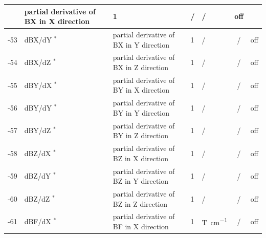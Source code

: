 \begin{landscape}
\begin{longtable}{|r|l|l|l|l|c|c|}
                           & partial derivative of BX in X direction  
                           & 1                            & /
			   & /              & off         
    \\ \hline
    -53                    & dBX/dY $^*$
                           & partial derivative of BX in Y direction  
                           & 1                            & /
			   & /              & off         
    \\ \hline
    -54                    & dBX/dZ $^*$
                           & partial derivative of BX in Z direction  
                           & 1                            & /
			   & /              & off         
    \\ \hline
    -55                    & dBY/dX $^*$
                           & partial derivative of BY in X direction  
                           & 1                            & /
			   & /              & off         
    \\ \hline
    -56                    & dBY/dY $^*$
                           & partial derivative of BY in Y direction  
                           & 1                            & /
			   & /              & off         
    \\ \hline
    -57                    & dBY/dZ $^*$
                           & partial derivative of BY in Z direction  
                           & 1                            & /
			   & /              & off         
    \\ \hline
    -58                    & dBZ/dX $^*$
                           & partial derivative of BZ in X direction  
                           & 1                            & /
			   & /              & off         
    \\ \hline
    -59                    & dBZ/dY $^*$
                           & partial derivative of BZ in Y direction  
                           & 1                            & /
			   & /              & off         
    \\ \hline
    -60                    & dBZ/dZ $^*$
                           & partial derivative of BZ in Z direction  
                           & 1                            & /
			   & /              & off         
    \\ \hline
    -61                    & dBF/dX $^*$
                           & partial derivative of BF in X direction  
                           & 1                            & \si{\tesla\per\centi\metre}
			   & /              & off         
    \\ \hline

\end{longtable}
\end{landscape}
